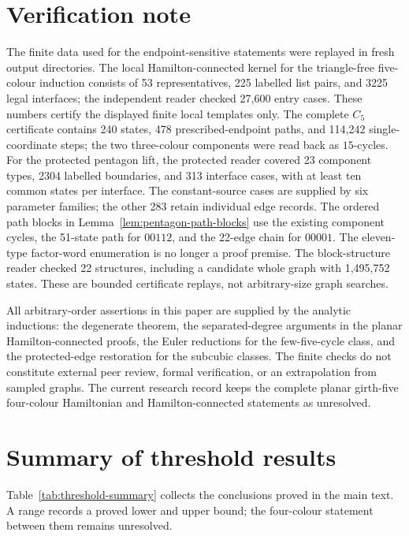 \documentclass[11pt]{article}
\theoremstyle{remark}
\numberwithin{equation}{section}
\numberwithin{table}{section}
\begin{document}
\section{Verification note}
\label{sec:verification}

The finite data used for the endpoint-sensitive statements were replayed in fresh output directories.  The local Hamilton-connected kernel for the triangle-free five-colour induction consists of 53 representatives, 225 labelled list pairs, and 3225 legal interfaces; the independent reader checked 27,600 entry cases.  These numbers certify the displayed finite local templates only.  The complete $C_5$ certificate contains 240 states, 478 prescribed-endpoint paths, and 114,242 single-coordinate steps; the two three-colour components were read back as $15$-cycles.  For the protected pentagon lift, the protected reader covered 23 component types, 2304 labelled boundaries, and 313 interface cases, with at least ten common states per interface. The constant-source cases are supplied by six parameter families; the other 283 retain individual edge records. The ordered path blocks in Lemma~\ref{lem:pentagon-path-blocks} use the existing component cycles, the 51-state path for $00112$, and the 22-edge chain for $00001$. The eleven-type factor-word enumeration is no longer a proof premise.  The block-structure reader checked 22 structures, including a candidate whole graph with 1,495,752 states.  These are bounded certificate replays, not arbitrary-size graph searches.

All arbitrary-order assertions in this paper are supplied by the analytic inductions: the degenerate theorem, the separated-degree arguments in the planar Hamilton-connected proofs, the Euler reductions for the few-five-cycle class, and the protected-edge restoration for the subcubic classes.  The finite checks do not constitute external peer review, formal verification, or an extrapolation from sampled graphs.  The current research record keeps the complete planar girth-five four-colour Hamiltonian and Hamilton-connected statements as unresolved.

\clearpage
\appendix
\section{Summary of threshold results}
\label{app:threshold-summary}
Table~\ref{tab:threshold-summary} collects the conclusions proved in the
main text. A range records a proved lower and upper bound; the
four-colour statement between them remains unresolved.
\end{document}
